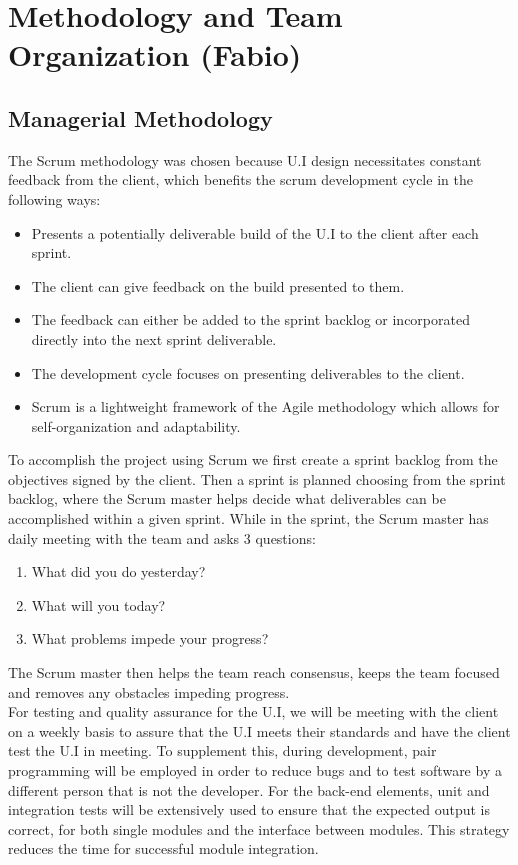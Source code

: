  \section{Methodology and Team Organization (Fabio)}
 \subsection{Managerial Methodology}
 The Scrum methodology was chosen because U.I design necessitates constant feedback from the client, which benefits the scrum development cycle in the following ways:\cite{scrumallianceWhatScrum2015}
 \begin{itemize}
 \item Presents a potentially deliverable build of the U.I to the client after each sprint.
 \item The client can give feedback on the build presented to them.
 \item The feedback can either be added to the sprint backlog or incorporated directly into the next sprint deliverable.
 \item The development cycle focuses on presenting deliverables to the client.
 \item Scrum is a lightweight framework of the Agile methodology which allows for self-organization and adaptability.
 \end{itemize}
 To accomplish the project using Scrum we first create a sprint backlog from the objectives signed by the client.\cite{scrumallianceWhatScrum2015} Then a sprint is planned choosing from the sprint backlog, where the Scrum master helps decide what deliverables can be accomplished within a given sprint.\cite{scrumallianceWhatScrum2015}\cite{eyeontechWhatScrumMaster2020} While in the sprint, the Scrum master has daily meeting with the team and asks 3 questions:\cite{eyeontechWhatScrumMaster2020}
 \begin{enumerate}
 \item What did you do yesterday?
 \item What will you today?
 \item What problems impede your progress?
 \end{enumerate}
 The Scrum master then helps the team reach consensus, keeps the team focused and removes any obstacles impeding progress.\cite{eyeontechWhatScrumMaster2020}\\
 For testing and quality assurance for the U.I, we will be meeting with the client on a weekly basis to assure that the U.I meets their standards and have the client test the U.I in meeting. To supplement this, during development, pair programming will be employed in order to reduce bugs and to test software by a different person that is not the developer. For the back-end elements, unit and integration tests will be extensively used to ensure that the expected output is correct, for both single modules and the interface between modules. This strategy reduces the time for successful module integration.\\
